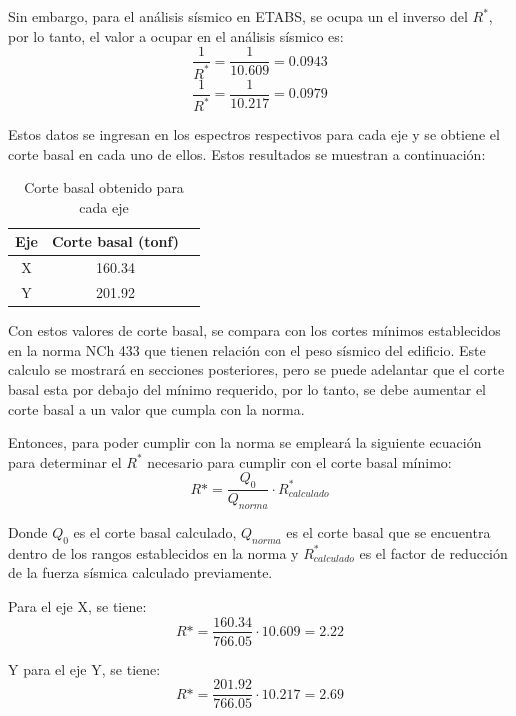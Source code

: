 Sin embargo, para el análisis sísmico en ETABS, se ocupa un el inverso del $R^*$, por lo tanto, el valor a ocupar en el análisis sísmico es:
\begin{equation}
    \frac{1}{R^*} = \frac{1}{10.609} = 0.0943
\end{equation}
\begin{equation}
    \frac{1}{R^*} = \frac{1}{10.217} = 0.0979
\end{equation}

Estos datos se ingresan en los espectros respectivos para cada eje y se obtiene el corte basal en cada uno de ellos. Estos resultados se muestran a continuación:

\begin{table}[H]
    \centering
    \begin{tabular}{ccc}
        Eje & Corte basal (tonf) \\
        \hline
        X & 160.34 \\
        Y & 201.92 \\
    \end{tabular}
    \caption{Corte basal obtenido para cada eje}
    \label{tab:corte_basal}
\end{table}

Con estos valores de corte basal, se compara con los cortes mínimos establecidos en la norma NCh 433 \cite{NCh433:1996} que tienen relación con el peso sísmico del edificio. Este calculo se mostrará en secciones posteriores, pero se puede adelantar que el corte basal esta por debajo del mínimo requerido, por lo tanto, se debe aumentar el corte basal a un valor que cumpla con la norma. 

Entonces, para poder cumplir con la norma se empleará la siguiente ecuación para determinar el $R^*$ necesario para cumplir con el corte basal mínimo:
\begin{equation}
    R*= \frac{Q_0}{Q_{norma}} \cdot R^*_{calculado}
\end{equation}

Donde $Q_0$ es el corte basal calculado, $Q_{norma}$ es el corte basal que se encuentra dentro de los rangos establecidos en la norma y $R^*_{calculado}$ es el factor de reducción de la fuerza sísmica calculado previamente.

Para el eje X, se tiene:
\begin{equation}
    R* = \frac{160.34}{766.05} \cdot 10.609 = 2.22
\end{equation}

Y para el eje Y, se tiene:
\begin{equation}
    R* = \frac{201.92}{766.05} \cdot 10.217 = 2.69
\end{equation}

